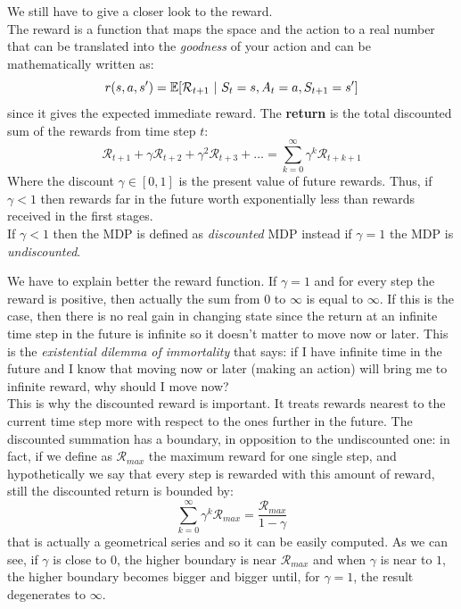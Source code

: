 We still have to give a closer look to the reward. \\
The reward is a function that maps the space and the action to a real number that can be translated into the \textit{goodness} of your action and can be mathematically written as:
\begin{equation}
    \mathnormal{r(s,a, s')} = \mathbb{E}[\mathcal{R}_{t+1} \ \vert \ S_t = s, A_t = a, S_{t+1} = s']
\end{equation}
since it gives the expected immediate reward.
\newline
\newline
The \textbf{return} is the total discounted sum of the rewards from time step $t$:
\begin{equation}
    \mathcal{R}_{t+1} + \gamma\mathcal{R}_{t+2} + \gamma^{2}\mathcal{R}_{t+3} + \dots = \sum^{\infty}_{k=0}\gamma^k \mathcal{R}_{t+k+1}
\end{equation}
Where the discount $\gamma \in [0,1]$ is the present value of future rewards. Thus, if $\gamma < 1$ then rewards far in the future worth exponentially less than rewards received in the first stages. \\
If $\gamma < 1$ then the MDP is defined as \textit{discounted} MDP instead if $\gamma = 1$ the MDP is \textit{undiscounted}.

We have to explain better the reward function. If $\gamma = 1$ and for every step the reward is positive, then actually the sum from $0$ to $\infty$ is equal to $\infty$. If this is the case, then there is no real gain in changing state since the return at an infinite time step in the future is infinite so it doesn't matter to move now or later. This is the \textit{existential dilemma of immortality} that says: if I have infinite time in the future and I know that moving now or later (making an action) will bring me to infinite reward, why should I move now? \\
This is why the discounted reward is important. It treats rewards nearest to the current time step more with respect to the ones further in the future. The discounted summation has a boundary, in opposition to the undiscounted one: in fact, if we define as $\mathcal{R}_{max}$ the maximum reward for one single step, and hypothetically we say that every step is rewarded with this amount of reward, still the discounted return is bounded by:
\begin{equation}
    \sum^{\infty}_{k=0}\gamma^k \mathcal{R}_{max} = \frac{\mathcal{R}_{max}}{1 - \gamma}
\end{equation}
that is actually a geometrical series and so it can be easily computed. As we can see, if $\gamma$ is close to $0$, the higher boundary is near $\mathcal{R}_{max}$ and when $\gamma$ is near to $1$, the higher boundary becomes bigger and bigger until, for $\gamma = 1$, the result degenerates to $\infty$.

